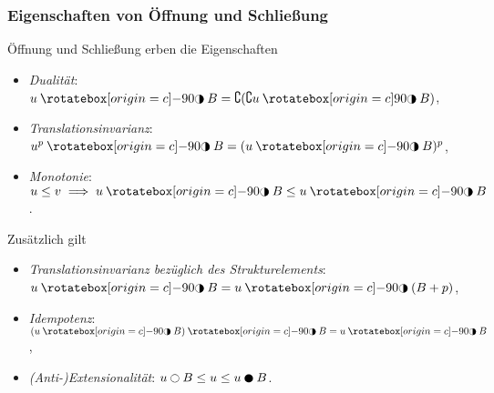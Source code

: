 \documentclass{beamer}
\begin{document}
\begin{frame}
    \frametitle{Eigenschaften von Öffnung und Schließung}
    \begin{lemma}
        Öffnung und Schließung erben die Eigenschaften
        \begin{itemize}
            \item
                \emph{Dualität}: $u \openclose B = \complement (\complement u \closeopen B)$,
            \item
                \emph{Translationsinvarianz}: $u^p \openclose B = (u \openclose B)^p$,
            \item
                \emph{Monotonie}: $u \le v \implies u \openclose B \le u \openclose B$.
        \end{itemize}
        Zusätzlich gilt
        \begin{itemize}
            \item
                \emph{Translationsinvarianz bezüglich des Strukturelements}: $u \openclose B = u \openclose (B + p)$,
            \item
                \emph{Idempotenz}: $(u \openclose B) \openclose B = u \openclose B$,
            \item
                \emph{(Anti-)Extensionalität}: $u \open B \le u \le u \close B$.
        \end{itemize}
    \end{lemma}
\end{frame}
\end{document}
